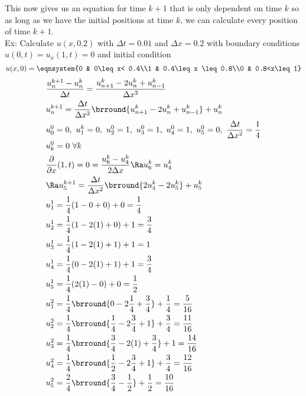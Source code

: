 This now gives us an equation for time $k+1$ that is only dependent on time $k$ so as long as we have the initial positions at time $k$, we can calculate every position of time $k+1$.\\
Ex: Calculate $u(x,0.2)$ with $\Delta t=0.01$ and $\Delta x=0.2$ with boundary conditions $u(0,t)=u_x(1,t)=0$ and initial condition
$$u(x,0)=\eqnsystem{0 & 0\leq x< 0.4\\1 & 0.4\leq x \leq 0.8\\0 & 0.8<x\leq 1}$$
\begin{align*}
    &\frac{u_n^{k+1}-u_n^k}{\Delta t}=\frac{u_{n+1}^k-2u_n^k+u_{n-1}^k}{\Delta x^2}\\
    &u_n^{k+1}=\frac{\Delta t}{\Delta x^2}\brround{u_{n+1}^k-2u_n^k+u_{n-1}^k}+u_n^k\\
    &u_0^0=0,\ u_1^k=0,\ u_2^0=1,\ u_3^0=1,\ u_4^0=1,\ u_5^0=0,\ \frac{\Delta t}{\Delta x^2}=\frac{1}{4}\\
    &u_k^0=0\ \forall k\\
    &\frac{\partial}{\partial x}(1,t)=0=\frac{u_6^k-u_4^k}{2\Delta x}\Ra u_6^k=u_4^k\\
    &\Ra u_5^{k+1}=\frac{\Delta t}{\Delta x^2}\brround{2u_4^k-2u_5^k}+u_5^k\\
    &u_1^1=\frac{1}{4}(1-0+0)+0=\frac{1}{4}\\
    &u_2^1=\frac{1}{4}(1-2(1)+0)+1=\frac{3}{4}\\
    &u_3^1=\frac{1}{4}(1-2(1)+1)+1=1\\
    &u_4^1=\frac{1}{4}(0-2(1)+1)+1=\frac{3}{4}\\
    &u_5^1=\frac{1}{4}(2(1)-0)+0=\frac{1}{2}\\
    &u_1^2=\frac{1}{4}\brround{0-2\frac{1}{4}+\frac{3}{4}}+\frac{1}{4}=\frac{5}{16}\\
    &u_2^2=\frac{1}{4}\brround{\frac{1}{4}-2\frac{3}{4}+1}+\frac{3}{4}=\frac{11}{16}\\
    &u_3^2=\frac{1}{4}\brround{\frac{3}{4}-2(1)+\frac{3}{4}}+1=\frac{14}{16}\\
    &u_4^2=\frac{1}{4}\brround{\frac{1}{2}-2\frac{3}{4}+1}+\frac{3}{4}=\frac{12}{16}\\
    &u_5^2=\frac{2}{4}\brround{\frac{3}{4}-\frac{1}{2}}+\frac{1}{2}=\frac{10}{16}
\end{align*}
